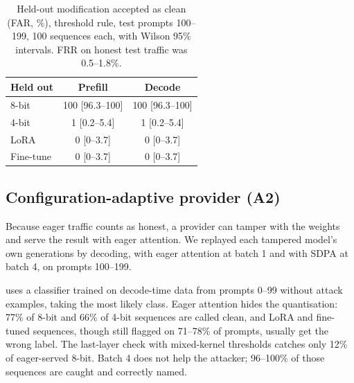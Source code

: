 \documentclass[10pt,twocolumn]{article}
\newcommand{\ci}[2]{{\scriptsize[#1--#2]}}
\begin{document}
\begin{table}[!htb]
\centering
\small
\caption{Held-out modification accepted as clean (FAR, \%), threshold rule, test prompts 100--199, 100 sequences each, with Wilson 95\% intervals. FRR on honest test traffic was 0.5--1.8\%.}
\label{tab:open}
\begin{tabular}{@{}lcc@{}}
\toprule
Held out & Prefill & Decode \\
\midrule
8-bit     & 100 \ci{96.3}{100} & 100 \ci{96.3}{100} \\
4-bit     & 1 \ci{0.2}{5.4}    & 1 \ci{0.2}{5.4} \\
LoRA      & 0 \ci{0}{3.7}      & 0 \ci{0}{3.7} \\
Fine-tune & 0 \ci{0}{3.7}      & 0 \ci{0}{3.7} \\
\bottomrule
\end{tabular}
\end{table}

\subsection{Configuration-adaptive provider (A2)}
\label{sec:res-attack}

Because eager traffic counts as honest, a provider can tamper with the weights and serve the result with eager attention.
We replayed each tampered model's own generations by decoding, with eager attention at batch 1 and with SDPA at batch 4, on prompts 100--199.

 uses a classifier trained on decode-time data from prompts 0--99 without attack examples, taking the most likely class.
Eager attention hides the quantisation: 77\% of 8-bit and 66\% of 4-bit sequences are called clean, and LoRA and fine-tuned sequences, though still flagged on 71--78\% of prompts, usually get the wrong label.
The last-layer check with mixed-kernel thresholds catches only 12\% of eager-served 8-bit.
Batch 4 does not help the attacker; 96--100\% of those sequences are caught and correctly named.
\end{document}
